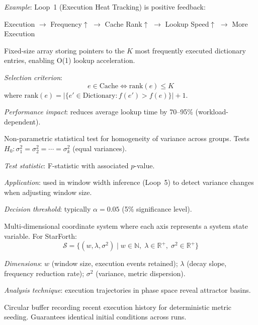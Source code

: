 \begin{description}
\textit{Example}: Loop~1 (Execution Heat Tracking) is positive feedback:
\begin{center}
  Execution $\to$ Frequency$\uparrow$ $\to$ Cache Rank$\uparrow$
  $\to$ Lookup Speed$\uparrow$ $\to$ More Execution
\end{center}

\item[Hot-Words Cache]
Fixed-size array storing pointers to the $K$ most frequently executed
dictionary entries, enabling O(1) lookup acceleration.

\textit{Selection criterion}:
\begin{equation*}
  e \in \text{Cache} \iff \text{rank}(e) \leq K
\end{equation*}
where $\text{rank}(e) = |\{e' \in \text{Dictionary} : f(e') > f(e)\}| + 1$.

\textit{Performance impact}: reduces average lookup time by 70--95\%
(workload-dependent).

\item[Levene's Test]
Non-parametric statistical test for homogeneity of variance across groups.
Tests $H_0\colon \sigma_1^2 = \sigma_2^2 = \cdots = \sigma_k^2$ (equal
variances).

\textit{Test statistic}: F-statistic with associated $p$-value.

\textit{Application}: used in window width inference (Loop~5) to detect
variance changes when adjusting window size.

\textit{Decision threshold}: typically $\alpha = 0.05$ (5\% significance
level).

\item[Phase Space]
Multi-dimensional coordinate system where each axis represents a system state
variable. For StarForth:
\begin{equation*}
  \mathcal{S} = \{(w, \lambda, \sigma^2) \mid w \in \mathbb{N},\;
  \lambda \in \mathbb{R}^+,\; \sigma^2 \in \mathbb{R}^+\}
\end{equation*}

\textit{Dimensions}: $w$ (window size, execution events retained);
$\lambda$ (decay slope, frequency reduction rate);
$\sigma^2$ (variance, metric dispersion).

\textit{Analysis technique}: execution trajectories in phase space reveal
attractor basins.

\item[Rolling Window of Truth]
Circular buffer recording recent execution history for deterministic metric
seeding. Guarantees identical initial conditions across runs.


\end{description}
